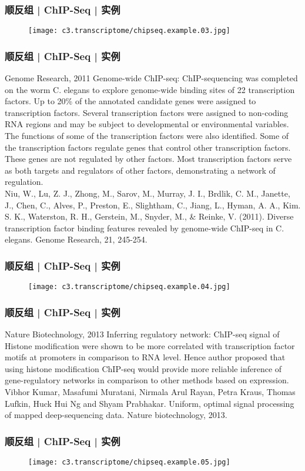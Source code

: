 \begin{frame}
  \frametitle{顺反组 | ChIP-Seq | 实例}
  \begin{figure}
    \centering
    \texttt{[image: c3.transcriptome/chipseq.example.03.jpg]}
  \end{figure}
\end{frame}

\begin{frame}
  \frametitle{顺反组 | ChIP-Seq | 实例}
  {\footnotesize
  \begin{block}{Genome Research, 2011}
  Genome-wide ChIP-seq: ChIP-sequencing was completed on the worm C. elegans to explore genome-wide binding sites of 22 transcription factors. Up to 20\% of the annotated candidate genes were assigned to transcription factors. Several transcription factors were assigned to non-coding RNA regions and may be subject to developmental or environmental variables. The functions of some of the transcription factors were also identified. Some of the transcription factors regulate genes that control other transcription factors. These genes are not regulated by other factors. Most transcription factors serve as both targets and regulators of other factors, demonstrating a network of regulation.\\
  \vspace{0.5em}
  Niu, W., Lu, Z. J., Zhong, M., Sarov, M., Murray, J. I., Brdlik, C. M., Janette, J., Chen, C., Alves, P., Preston, E., Slightham, C., Jiang, L., Hyman, A. A., Kim. S. K., Waterston, R. H., Gerstein, M., Snyder, M., \& Reinke, V. (2011). Diverse transcription factor binding features revealed by genome-wide ChIP-seq in C. elegans. Genome Research, 21, 245-254.
  \end{block}
}
\end{frame}

\begin{frame}
  \frametitle{顺反组 | ChIP-Seq | 实例}
  \begin{figure}
    \centering
    \texttt{[image: c3.transcriptome/chipseq.example.04.jpg]}
  \end{figure}
\end{frame}

\begin{frame}
  \frametitle{顺反组 | ChIP-Seq | 实例}
  \begin{block}{Nature Biotechnology, 2013}
  Inferring regulatory network: ChIP-seq signal of Histone modification were shown to be more correlated with transcription factor motifs at promoters in comparison to RNA level. Hence author proposed that using histone modification ChIP-seq would provide more reliable inference of gene-regulatory networks in comparison to other methods based on expression.\\
  \vspace{0.5em}
  Vibhor Kumar, Masafumi Muratani, Nirmala Arul Rayan, Petra Kraus, Thomas Lufkin, Huck Hui Ng and Shyam Prabhakar. Uniform, optimal signal processing of mapped deep-sequencing data. Nature biotechnology, 2013.
  \end{block}
\end{frame}

\begin{frame}
  \frametitle{顺反组 | ChIP-Seq | 实例}
  \begin{figure}
    \centering
    \texttt{[image: c3.transcriptome/chipseq.example.05.jpg]}
  \end{figure}
\end{frame}

